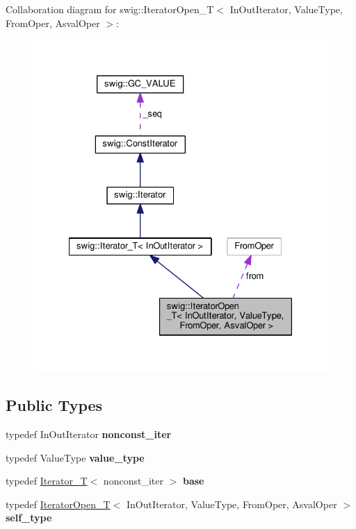 Collaboration diagram for swig\+:\+:Iterator\+Open\+\_\+T$<$ In\+Out\+Iterator, Value\+Type, From\+Oper, Asval\+Oper $>$\+:
\nopagebreak
\begin{figure}[H]
\begin{center}
\leavevmode
\includegraphics[width=328pt]{classswig_1_1IteratorOpen__T__coll__graph}
\end{center}
\end{figure}
\subsection*{Public Types}
\begin{DoxyCompactItemize}
\item 
typedef In\+Out\+Iterator {\bfseries nonconst\+\_\+iter}\hypertarget{classswig_1_1IteratorOpen__T_ac7c266becdaea273f92e52bea7acf521}{}\label{classswig_1_1IteratorOpen__T_ac7c266becdaea273f92e52bea7acf521}

\item 
typedef Value\+Type {\bfseries value\+\_\+type}\hypertarget{classswig_1_1IteratorOpen__T_a1895e69ff0f222285bf19225584c607a}{}\label{classswig_1_1IteratorOpen__T_a1895e69ff0f222285bf19225584c607a}

\item 
typedef \hyperlink{classswig_1_1Iterator__T}{Iterator\+\_\+T}$<$ nonconst\+\_\+iter $>$ {\bfseries base}\hypertarget{classswig_1_1IteratorOpen__T_ab0d7840bb608603b832c17f2b411c1ce}{}\label{classswig_1_1IteratorOpen__T_ab0d7840bb608603b832c17f2b411c1ce}

\item 
typedef \hyperlink{classswig_1_1IteratorOpen__T}{Iterator\+Open\+\_\+T}$<$ In\+Out\+Iterator, Value\+Type, From\+Oper, Asval\+Oper $>$ {\bfseries self\+\_\+type}\hypertarget{classswig_1_1IteratorOpen__T_a8b7bb28cfb242e86b5b602e16d2e7ce8}{}\label{classswig_1_1IteratorOpen__T_a8b7bb28cfb242e86b5b602e16d2e7ce8}

\end{DoxyCompactItemize}
